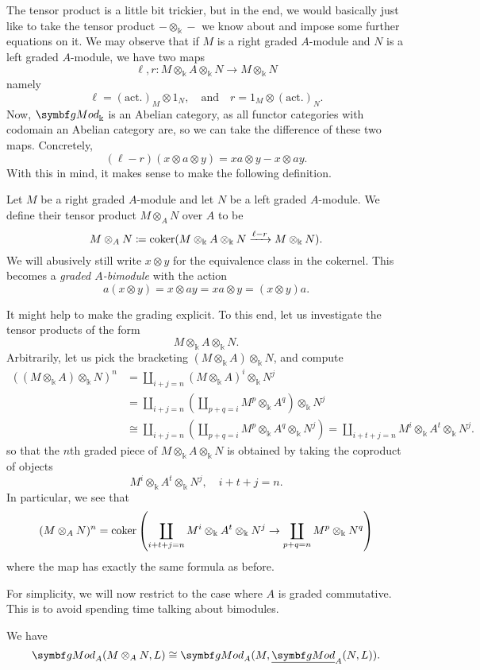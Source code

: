 The tensor product is a little bit trickier, but in the end, we would basically just like to take the tensor product \(-\otimes_\Bbbk-\) we know
about and impose some further equations on it. We may observe that if \(M\) is a right graded \(A\)-module and \(N\) is a left graded \(A\)-module, we have two maps
\[ \ell,r\!: M\otimes_\Bbbk A\otimes_\Bbbk N \to M\otimes_\Bbbk N \]
namely
\[ \ell = (\text{act.})_M\otimes 1_N,\quad \text{and}\quad r=1_M\otimes(\text{act.})_N. \]
Now, \(\gMod_\Bbbk\) is an Abelian category, as all functor categories with codomain an Abelian category are, so we can take the difference of these two maps.
Concretely,
\[ (\ell-r)(x\otimes a \otimes y) = xa\otimes y - x\otimes ay. \]
With this in mind, it makes sense to make the following definition.
\begin{definition}
	Let \(M\) be a right graded \(A\)-module and let \(N\) be a left graded \(A\)-module. We define their tensor product \(M\otimes_A N\) over \(A\) to be
	\[ M\otimes_A N \coloneq \operatorname{coker}(M\otimes_\Bbbk A\otimes_\Bbbk N \xrightarrow{\ell - r} M\otimes_\Bbbk N). \]
	We will abusively still write \(x\otimes y\) for the equivalence class in the cokernel. This becomes a \emph{graded \(A\)-bimodule} with the action
	\[ a(x\otimes y) = x\otimes ay = xa\otimes y = (x\otimes y)a. \]
\end{definition}
\begin{remark}
	It might help to make the grading explicit. To this end, let us investigate the tensor products of the form
	\[ M \otimes_\Bbbk A \otimes_\Bbbk N. \]
	Arbitrarily, let us pick the bracketing \((M\otimes_\Bbbk A)\otimes_\Bbbk N\), and compute
	\begin{align*}
		((M\otimes_\Bbbk A)\otimes_\Bbbk N)^n &= \coprod_{i+j = n} (M\otimes_\Bbbk A)^i\otimes_\Bbbk N^j \\
		&= \coprod_{i+j = n} \left(\coprod_{p+q=i} M^p\otimes_\Bbbk A^q \right) \otimes_\Bbbk N^j \\
		&\cong \coprod_{i+j = n} \left(\coprod_{p+q=i} M^p\otimes_\Bbbk A^q \otimes_\Bbbk N^j \right) = \coprod_{i+t+j=n} M^i\otimes_\Bbbk A^t \otimes_\Bbbk N^j.
	\end{align*}
	so that the \(n\)th graded piece of \(M\otimes_\Bbbk A\otimes_\Bbbk N\) is obtained by taking the coproduct of objects
	\[ M^i\otimes_\Bbbk A^t\otimes_\Bbbk N^j,\quad i+t+j = n. \]
	In particular, we see that
	\[ (M\otimes_A N)^n = \operatorname{coker}\left( \coprod_{i+t+j=n} M^i\otimes_\Bbbk A^t \otimes_\Bbbk N^j \to \coprod_{p+q=n} M^p\otimes_\Bbbk N^q \right) \]
	where the map has exactly the same formula as before.
\end{remark}

For simplicity, we will now restrict to the case where \(A\) is graded commutative. This is to avoid spending time talking about bimodules.

\begin{proposition}
	We have
	\[ \gMod_A(M\otimes_A N,L) \cong \gMod_A(M,\ugMod_A(N,L)). \]
\end{proposition}